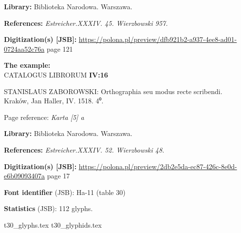 \documentclass[12pt]{article}
\newcommand{\bg}{\begingl}
\newcommand{\exampleBib}[1]{{\relsize{2}\Junicode\textbf{The
      example:}\\[2ex] CATALOGUS LIBRORUM \textbf{#1}}}
\newcommand{\exampleDesc}[1]{{\relsize{0}\Junicode#1}}
\newcommand{\exampleDig}[1]{{\relsize{0}\Junicode \textbf{Digitization(s) [JSB]:} #1}}
\newcommand{\exampleLib}[1]{{\relsize{0}\Junicode \textbf{Library:} #1}}
\newcommand{\examplePL}[1]{}
\newcommand{\exampleEN}[1]{}
\newcommand{\fontID}[2]{{\relsize{1}\Junicode\textbf{Font identifier} (JSB): #1 (table #2)}}
\newcommand{\fontstat}[1]{{\relsize{1}\Junicode\textbf{Statistics} (JSB): #1 glyphs.}}
\newcommand{\exampleRef}[1]{{\relsize{0}\Junicode \textbf{References:} #1}}
\newcommand{\examplePage}[1]{{Page reference: \relsize{0}\Junicode#1}}
\begin{document}
  \bigskip
\exampleLib{Biblioteka Narodowa. Warszawa.}



\bigskip
\exampleRef{\textit{Estreicher.XXXIV. 45. Wierzbowski 957.}}

 \bigskip
\exampleDig{\url{https://polona.pl/preview/dfb921b2-a937-4ee8-ad01-0724aa52c76a}
  page 121}

\bigskip

\examplePL{Pismo 11 (tekst łaciński). — Rubryki \theta, \iota. — Cyfry 6.}

    \medskip

    \exampleEN{Font 11 (Latin text). — Rubric \theta{}, \iota. — Digits 6.}


\bigskip

\exampleBib{IV:16}

\bigskip


\exampleDesc{STANISLAUS ZABOROWSKI: Orthographia seu modus recte scribendi. Kraków, Jan Haller, IV. 1518. 4⁰.}




\medskip
\examplePage{\textit{Karta [5] a}}

  \bigskip
\exampleLib{Biblioteka Narodowa. Warszawa.}



\bigskip
\exampleRef{\textit{Estreicher.XXXIV. 52. Wierzbowski 48.}}

 \bigskip
\exampleDig{\url{https://polona.pl/preview/2db2e5da-ec87-426c-8e0d-e6b09093407a}
  page 17}

\bigskip

\examplePL{Pismo 11 (tekst polski). — Rubryka \theta{}. — Inicjał 60 (V).}

    \medskip

    \exampleEN{Font 11 (Polish text). — Rubric \theta{}. — Initial 60. (V)}


\bigskip


\fontID{Ha-11}{30}

\fontstat{112}

  {t30_glyphs.tex}
  {t30_glyphids.tex}

 
 \newpage


\end{document}

